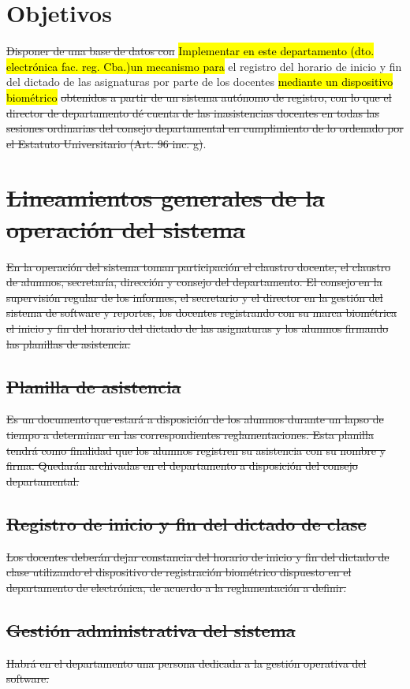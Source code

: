 \documentclass[a4paper, 11pt]{article} %
\begin{document}
\section*{Objetivos}
\st{Disponer de una base de datos con} \hl{Implementar en este departamento (dto. electrónica fac. reg. Cba.)un mecanismo para} el registro del horario de inicio y fin del dictado de las asignaturas por parte de los docentes \hl{mediante un dispositivo biométrico} \st{obtenidos a partir de un sistema autónomo de registro, con lo que el director de departamento dé cuenta de las inasistencias docentes en todas las sesiones ordinarias del consejo departamental en cumplimiento de lo ordenado por el Estatuto Universitario (Art. 96 inc. g)}.
\section*{\st{Lineamientos generales de la operación del sistema}}
\st{En la operación del sistema toman participación el claustro docente, el claustro de alumnos, secretaría, dirección y consejo del departamento. El consejo en la supervisión regular de los informes, el secretario y el director en la gestión del sistema de software y reportes, los docentes registrando con su marca biométrica el inicio y fin del horario del dictado de las asignaturas y los alumnos firmando las planillas de asistencia.}
\subsection*{\st{Planilla de asistencia}}
\st{Es un documento que estará a disposición de los alumnos durante un lapso de tiempo a determinar en las correspondientes reglamentaciones. Esta planilla tendrá como finalidad que los alumnos registren su asistencia con su nombre y firma. Quedarán archivadas en el departamento a disposición del consejo departamental.}
\subsection*{\st{Registro de inicio y fin del dictado de clase}}
\st{Los docentes deberán dejar constancia del horario de inicio y fin del dictado de clase utilizando el dispositivo de registración biométrico dispuesto en el departamento de electrónica, de acuerdo a la reglamentación a definir.}\\
\subsection*{\st{Gestión administrativa del sistema}}
\st{Habrá en el departamento una persona dedicada a la gestión operativa del software.}
\end{document}
